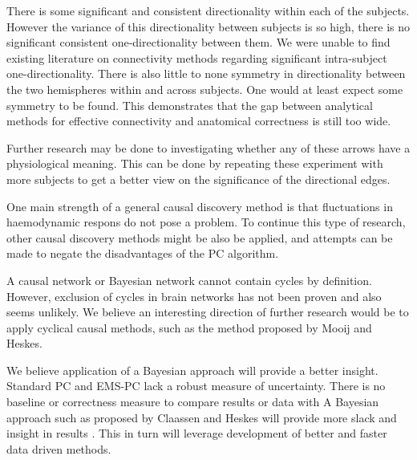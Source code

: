 \documentclass[a4paper, 10pt, english, onecolumn]{article}
\begin{document}
There is some significant and consistent directionality within each of the subjects.
However the variance of this directionality between subjects is so high, there is no significant consistent one-directionality between them.
We were unable to find existing literature on connectivity methods regarding significant intra-subject one-directionality.
There is also little to none symmetry in directionality between the two hemispheres within and across subjects.
One would at least expect some symmetry to be found.
This demonstrates that the gap between analytical methods for effective connectivity and anatomical correctness is still too wide.

Further research may be done to investigating whether any of these arrows have a physiological meaning.
This can be done by repeating these experiment with more subjects to get a better view on the significance of the directional edges.

One main strength of a general causal discovery method is that fluctuations in haemodynamic respons do not pose a problem.
To continue this type of research, other causal discovery methods might be also be applied, and attempts can be made to negate the disadvantages of the PC algorithm.

A causal network or Bayesian network cannot contain cycles by definition.
However, exclusion of cycles in brain networks has not been proven and also seems unlikely.
We believe an interesting direction of further research would be to apply cyclical causal methods, such as the method proposed by Mooij and Heskes\cite{Mooij20013}.

We believe application of a Bayesian approach will provide a better insight.
Standard PC and EMS-PC lack a robust measure of uncertainty.
There is no baseline or correctness measure to compare results or data with
A Bayesian approach such as proposed by Claassen and Heskes will provide more slack and insight in results \cite{claassen2012}.
This in turn will leverage development of better and faster data driven methods.




\end{document}
